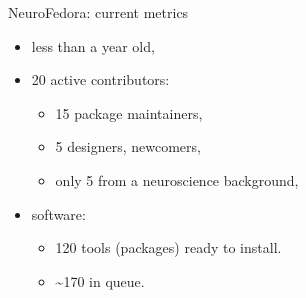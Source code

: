 \begin{frame}[c]{NeuroFedora: current metrics}
  \begin{itemize}
    \item \alert{less than a year old\footnotemark[8],}
      \pause{}
    \item \textcolor{FirstGreen}{20 active contributors:}
      \begin{itemize}
        \item 15 package maintainers,
        \item 5 designers, newcomers,
        \item only 5 from a neuroscience background,
      \end{itemize}
      \pause{}
    \item \textcolor{FriendsMagenta}{software:}
      \begin{itemize}
        \item 120 tools (packages) ready to install\footnotemark[9].
        \item \textasciitilde{}170 in queue\footnotemark[10].
      \end{itemize}
  \end{itemize}
\end{frame}
